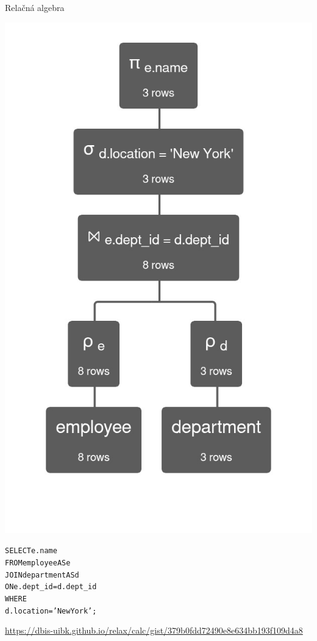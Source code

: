 \documentclass[12pt]{beamer}
\begin{document}
\begin{frame}[fragile]{Relačná algebra}
\begin{minipage}{.45\textwidth}
\includegraphics[scale=.2]{query3.jpg}
\end{minipage}
\begin{minipage}{.5\textwidth}
\begin{alltt}
SELECT e.name
FROM employee AS e
  JOIN department AS d
    ON e.dept_id = d.dept_id
WHERE
  d.location = 'New York';
\end{alltt}
\end{minipage}

\bigskip
\tiny{\url{https://dbis-uibk.github.io/relax/calc/gist/379b0fdd72490e8e634bb193f109d4a8}}
\end{frame}
\end{document}
